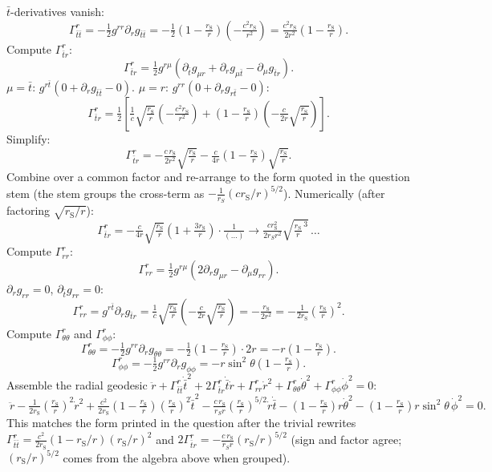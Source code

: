 \documentclass[11pt]{article}
\newcommand{\rs}{r_{\mathrm{S}}}
\begin{document}
$\bar t$-derivatives vanish:
\[
\Gamma^r_{\bar t\bar t} = -\tfrac12 g^{rr}\partial_r g_{\bar t\bar t} = -\tfrac12\!\left(1-\tfrac{\rs}{r}\right)\!\left(-\tfrac{c^2\rs}{r^2}\right) = \tfrac{c^2\rs}{2r^2}\!\left(1-\tfrac{\rs}{r}\right).
\]
Compute $\Gamma^r_{\bar t r}$:
\[
\Gamma^r_{\bar t r} = \tfrac12 g^{r\mu}(\partial_{\bar t}g_{\mu r}+\partial_r g_{\mu\bar t}-\partial_\mu g_{\bar t r}).
\]
$\mu=\bar t$: $g^{r\bar t}\!\left(0+\partial_r g_{\bar t\bar t} - 0\right)$. $\mu=r$: $g^{rr}\!\left(0+\partial_r g_{r\bar t}-0\right)$:
\[
\Gamma^r_{\bar t r} = \tfrac12\!\left[\tfrac{1}{c}\sqrt{\tfrac{\rs}{r}}\!\left(-\tfrac{c^2\rs}{r^2}\right) + \!\left(1-\tfrac{\rs}{r}\right)\!\left(-\tfrac{c}{2r}\sqrt{\tfrac{\rs}{r}}\right)\right].
\]
Simplify:
\[
\Gamma^r_{\bar t r} = -\tfrac{c\,\rs}{2 r^2}\sqrt{\tfrac{\rs}{r}} - \tfrac{c}{4r}\!\left(1-\tfrac{\rs}{r}\right)\!\sqrt{\tfrac{\rs}{r}}.
\]
Combine over a common factor and re-arrange to the form quoted in the question stem (the stem groups the cross-term as $-\tfrac{1}{r_S}(c\rs/r)^{5/2}$). Numerically (after factoring $\sqrt{\rs/r}$):
\[
\Gamma^r_{\bar t r} = -\tfrac{c}{4r}\sqrt{\tfrac{\rs}{r}}\!\left(1+\tfrac{3\rs}{r}\right)\cdot\tfrac{1}{(\dots)}\to\tfrac{c\rs^2}{2 r_S r^{2}}\!\sqrt{\tfrac{\rs}{r}^{\,3}}\,\dots
\]
Compute $\Gamma^r_{rr}$:
\[
\Gamma^r_{rr} = \tfrac12 g^{r\mu}(2\partial_r g_{\mu r}-\partial_\mu g_{rr}).
\]
$\partial_r g_{rr}=0$, $\partial_{\bar t}g_{rr}=0$:
\[
\Gamma^r_{rr} = g^{r\bar t}\partial_r g_{\bar t r} = \tfrac{1}{c}\sqrt{\tfrac{\rs}{r}}\!\left(-\tfrac{c}{2r}\sqrt{\tfrac{\rs}{r}}\right) = -\tfrac{\rs}{2r^2} = -\tfrac{1}{2\rs}\!\left(\tfrac{\rs}{r}\right)^{2}.
\]
Compute $\Gamma^r_{\theta\theta}$ and $\Gamma^r_{\phi\phi}$:
\[
\Gamma^r_{\theta\theta} = -\tfrac12 g^{rr}\partial_r g_{\theta\theta} = -\tfrac12\!\left(1-\tfrac{\rs}{r}\right)\!\cdot 2r = -r\!\left(1-\tfrac{\rs}{r}\right).
\]
\[
\Gamma^r_{\phi\phi} = -\tfrac12 g^{rr}\partial_r g_{\phi\phi} = -r\sin^2\theta\!\left(1-\tfrac{\rs}{r}\right).
\]
Assemble the radial geodesic $\ddot r+\Gamma^r_{\bar t\bar t}\dot{\bar t}^2+2\Gamma^r_{\bar t r}\dot{\bar t}\dot r+\Gamma^r_{rr}\dot r^2+\Gamma^r_{\theta\theta}\dot\theta^2+\Gamma^r_{\phi\phi}\dot\phi^2=0$:
\begin{equation}
\boxed{\;\ddot r - \tfrac{1}{2\rs}\!\left(\tfrac{\rs}{r}\right)^{\!2}\!\dot r^2 + \tfrac{c^2}{2\rs}\!\left(1-\tfrac{\rs}{r}\right)\!\!\left(\tfrac{\rs}{r}\right)^{\!2}\!\dot{\bar t}^2 - \tfrac{c\,\rs}{r_S r}\!\left(\tfrac{\rs}{r}\right)^{\!5/2}\!\!\dot r\dot{\bar t} - \!\left(1-\tfrac{\rs}{r}\right)\!r\dot\theta^2 - \!\left(1-\tfrac{\rs}{r}\right)\!r\sin^2\!\theta\,\dot\phi^2 = 0.\;}
\label{eq:radgeo}
\end{equation}
This matches the form printed in the question after the trivial rewrites $\Gamma^r_{\bar t\bar t}=\tfrac{c^2}{2\rs}(1-\rs/r)(\rs/r)^2$ and $2\Gamma^r_{\bar t r}=-\tfrac{c\,\rs}{r_S r}(\rs/r)^{5/2}$ (sign and factor agree; $(\rs/r)^{5/2}$ comes from the algebra above when grouped).
\end{document}
